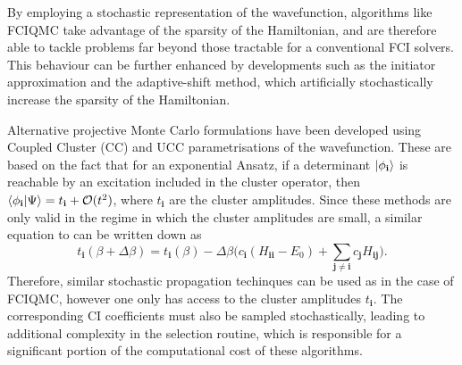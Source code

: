 \documentclass[%
 reprint,
 amsmath,amssymb,
 aps,
]{revtex4-2}
\begin{document}
{ By employing a stochastic representation of the wavefunction, algorithms like FCIQMC take advantage of the sparsity of the Hamiltonian, and are therefore able to tackle problems far beyond those tractable for a conventional FCI solvers.\cite{Weser2022} This behaviour can be further enhanced by developments such as the initiator approximation\cite{Cleland2010} and the adaptive-shift method,\cite{Ghanem2019, Ghanem2020} which artificially stochastically increase the sparsity of the Hamiltonian.}

{Alternative projective Monte Carlo formulations have been developed using Coupled Cluster (CC)\cite{Thom2010} and UCC\cite{Filip2020} parametrisations of the wavefunction. These are based on the fact that for an exponential Ansatz, if a determinant $\ket{\phi_\mathbf{i}}$ is reachable by an excitation included in the cluster operator, then $\braket{\phi_\mathbf{i}|\Psi} = t_\mathbf{i} + \mathcal{O}(t^2)$, where $t_\mathbf{i}$ are the cluster amplitudes. Since these methods are only valid in the regime in which the cluster amplitudes are small, a similar equation to  can be written down as
\begin{equation}
      t_\mathbf{i}(\beta + \Delta \beta) = t_\mathbf{i}(\beta) - \Delta\beta\Big(c_\mathbf{i} (H_\mathbf{ii} - E_0) + \sum_{\mathbf{j} \neq \mathbf{i}} c_\mathbf{j}H_\mathbf{ij}\Big).  
  \label{eq:pop_dyn2}
\end{equation}
Therefore, similar stochastic propagation techinques can be used as in the case of FCIQMC, however one only has access to the cluster amplitudes $t_\mathbf{i}$. The corresponding CI coefficients must also be sampled stochastically, leading to additional complexity in the selection routine, which is responsible for a significant portion of the computational cost of these algorithms.}
\end{document}
